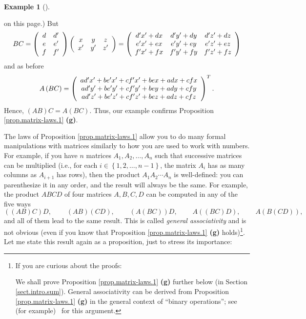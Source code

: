 \documentclass[numbers=enddot,12pt,final,onecolumn,notitlepage]{scrartcl}%
\theoremstyle{definition}
\newtheorem{exam}[theo]{Example}
\newenvironment{example}[1][]
{\begin{exam}[#1]\begin{leftbar}}
{\end{leftbar}\end{exam}}
\begin{document}
\begin{example}
on this page.) But
\[
BC=\left(
\begin{array}
[c]{cc}%
d & d^{\prime}\\
e & e^{\prime}\\
f & f^{\prime}%
\end{array}
\right)  \left(
\begin{array}
[c]{ccc}%
x & y & z\\
x^{\prime} & y^{\prime} & z^{\prime}%
\end{array}
\right)  =\left(
\begin{array}
[c]{ccc}%
d^{\prime}x^{\prime}+dx & d^{\prime}y^{\prime}+dy & d^{\prime}z^{\prime}+dz\\
e^{\prime}x^{\prime}+ex & e^{\prime}y^{\prime}+ey & e^{\prime}z^{\prime}+ez\\
f^{\prime}x^{\prime}+fx & f^{\prime}y^{\prime}+fy & f^{\prime}z^{\prime}+fz
\end{array}
\right)
\]
and as before
\[
A\left(  BC\right)  =\left(
\begin{array}
[c]{c}%
ad^{\prime}x^{\prime}+be^{\prime}x^{\prime}+cf^{\prime}x^{\prime
}+bex+adx+cfx\\
ad^{\prime}y^{\prime}+be^{\prime}y^{\prime}+cf^{\prime}y^{\prime
}+bey+ady+cfy\\
ad^{\prime}z^{\prime}+be^{\prime}z^{\prime}+cf^{\prime}z^{\prime}+bez+adz+cfz
\end{array}
\right)  ^{T}.
\]
Hence, $\left(  AB\right)  C=A\left(  BC\right)  $. Thus, our example confirms
Proposition \ref{prop.matrix-laws.1} \textbf{(g)}.
\end{example}

The laws of Proposition \ref{prop.matrix-laws.1} allow you to do many formal
manipulations with matrices similarly to how you are used to work with
numbers. For example, if you have $n$ matrices $A_{1},A_{2},\ldots,A_{n}$ such
that successive matrices can be multiplied (i.e., for each $i\in\left\{
1,2,\ldots,n-1\right\}  $, the matrix $A_{i}$ has as many columns as $A_{i+1}$
has rows), then the product $A_{1}A_{2}\cdots A_{n}$ is well-defined: you can
parenthesize it in any order, and the result will always be the same. For
example, the product $ABCD$ of four matrices $A,B,C,D$ can be computed in any
of the five ways%
\[
\left(  \left(  AB\right)  C\right)  D,\ \ \ \ \ \ \ \ \ \ \left(  AB\right)
\left(  CD\right)  ,\ \ \ \ \ \ \ \ \ \ \left(  A\left(  BC\right)  \right)
D,\ \ \ \ \ \ \ \ \ \ A\left(  \left(  BC\right)  D\right)
,\ \ \ \ \ \ \ \ \ \ A\left(  B\left(  CD\right)  \right)  ,
\]
and all of them lead to the same result. This is called \textit{general
associativity} and is not obvious (even if you know that Proposition
\ref{prop.matrix-laws.1} \textbf{(g)} holds)\footnote{If you are curious about
the proofs:
\par
We shall prove Proposition \ref{prop.matrix-laws.1} \textbf{(g)} further below
(in Section \ref{sect.intro.sum}). General associativity can be derived from
Proposition \ref{prop.matrix-laws.1} \textbf{(g)} in the general context of
\textquotedblleft binary operations\textquotedblright; see (for
example)\ \cite{Zuker14} for this argument.}. Let me state this result again
as a proposition, just to stress its importance:
\end{document}
